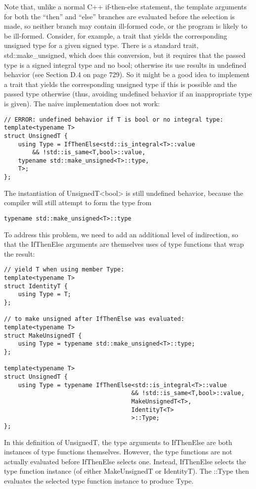 Note that, unlike a normal C++ if-then-else statement, the template arguments for both the “then” and “else” branches are evaluated before the selection is made, so neither branch may contain ill-formed code, or the program is likely to be ill-formed. Consider, for example, a trait that yields the corresponding unsigned type for a given signed type. There is a standard trait, std::make\_unsigned, which does this conversion, but it requires that the passed type is a signed integral type and no bool; otherwise its use results in undefined behavior (see Section D.4 on page 729). So it might be a good idea to implement a trait that yields the corresponding unsigned type if this is possible and the passed type otherwise (thus, avoiding undefined behavior if an inappropriate type is given). The naive implementation does not work:

\begin{lstlisting}[style=styleCXX]
// ERROR: undefined behavior if T is bool or no integral type:
template<typename T>
struct UnsignedT {
	using Type = IfThenElse<std::is_integral<T>::value
		&& !std::is_same<T,bool>::value,
	typename std::make_unsigned<T>::type,
	T>;
};
\end{lstlisting}

The instantiation of UnsignedT<bool> is still undefined behavior, because the compiler will still attempt to form the type from

\begin{lstlisting}[style=styleCXX]
typename std::make_unsigned<T>::type
\end{lstlisting}

To address this problem, we need to add an additional level of indirection, so that the IfThenElse arguments are themselves uses of type functions that wrap the result:

\begin{lstlisting}[style=styleCXX]
// yield T when using member Type:
template<typename T>
struct IdentityT {
	using Type = T;
};

// to make unsigned after IfThenElse was evaluated:
template<typename T>
struct MakeUnsignedT {
	using Type = typename std::make_unsigned<T>::type;
};

template<typename T>
struct UnsignedT {
	using Type = typename IfThenElse<std::is_integral<T>::value
									&& !std::is_same<T,bool>::value,
									MakeUnsignedT<T>,
									IdentityT<T>
									>::Type;
};
\end{lstlisting}

In this definition of UnsignedT, the type arguments to IfThenElse are both instances of type functions themselves. However, the type functions are not actually evaluated before IfThenElse selects one. Instead, IfThenElse selects the type function instance (of either MakeUnsignedT or IdentityT). The ::Type then evaluates the selected type function instance to produce Type.


